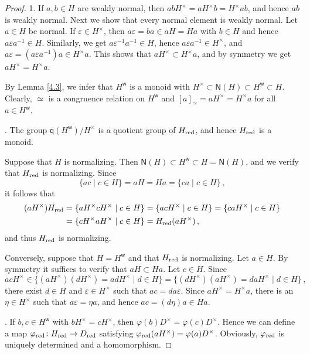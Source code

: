 \documentclass[a4paper]{amsart}
\theoremstyle{definition}
\numberwithin{equation}{section}
\begin{document}
\begin{proof}
1. If $a, b \in H$ are weakly normal, then $abH^{\times} =
aH^{\times}b = H^{\times} ab$, and hence $ab$ is weakly normal. Next
we show that every normal element is weakly normal. Let $a \in H$ be
normal. If $\varepsilon \in H^{\times}$, then $a \varepsilon = ba
\in aH = Ha$ with $b \in H$ and hence $a \varepsilon a^{-1} \in H$.
Similarly, we get $a \varepsilon^{-1}a^{-1} \in H$, hence $a
\varepsilon a^{-1} \in H^{\times}$, and $a \varepsilon = (a
\varepsilon a^{-1})a \in H^{\times} a$. This shows that $aH^{\times}
\subset H^{\times}a$, and by symmetry we get $aH^{\times} =
H^{\times} a$.

By Lemma \ref{4.3}, we infer that $H^{\mathsf w}$ is a monoid with
$H^{\times} \subset \mathsf N (H) \subset H^{\mathsf w} \subset H$.
Clearly, $\simeq$ is a congruence relation on $H^{\mathsf w}$ and
$[a]_{\simeq} = aH^{\times} = H^{\times}a$ for all $a \in H^{\mathsf
w}$.

. The group $\mathsf q (H^{\mathsf w})/H^{\times}$ is a quotient
group of $H_{{\text{\rm red}}}$, and hence $H_{{\text{\rm red}}}$ is a monoid.

Suppose that $H$ is normalizing. Then $\mathsf N (H) \subset
H^{\mathsf w} \subset H = \mathsf N (H)$, and we verify that
$H_{{\text{\rm red}}}$ is normalizing. Since
\[
\{ a c \mid c \in H \} = aH = Ha = \{ ca \mid c \in H \} \,,
\]
it follows that
\[
\begin{aligned}
(aH^{\times}) H_{{\text{\rm red}}} & = \{ aH^{\times} c H^{\times} \mid c \in H
\} = \{ ac H^{\times} \mid c \in H \} = \{ ca H^{\times} \mid c \in
H \} \\ & = \{ cH^{\times} a H^{\times} \mid c \in H \} =
H_{{\text{\rm red}}}(aH^{\times}) \,,
\end{aligned}
\]
and thus $H_{{\text{\rm red}}}$ is normalizing.

\smallskip
Conversely, suppose that $H = H^{\mathsf w}$ and that $H_{{\text{\rm red}}}$ is
normalizing. Let $a \in H$. By symmetry it suffices to verify that
$a H \subset Ha$. Let $c \in H$. Since
\[
acH^{\times} \in \{ (aH^{\times})(d H^{\times}) = a d H^{\times}
\mid d \in H \} = \{ (dH^{\times})(aH^{\times}) = daH^{\times} \mid
d \in H \} \,,
\]
there exist $d \in H$  and $\varepsilon \in H^{\times}$ such that
$ac = da \varepsilon$. Since $aH^{\times} = H^{\times}a$, there is
an $\eta \in H^{\times}$ such that $a \varepsilon = \eta a$, and
hence $ac = (d\eta)a \in Ha$.

. If $b, c \in H^{\mathsf w}$ with $bH^{\times} = c H^{\times}$, then $\varphi (b)D^{\times} = \varphi (c) D^{\times}$. Hence we can define a map $\varphi_{{\text{\rm red}}} \colon H_{{\text{\rm red}}} \to D_{{\text{\rm red}}}$ satisfying $\varphi_{{\text{\rm red}}} (aH^{\times}) = \varphi (a) D^{\times}$. Obviously, $\varphi_{{\text{\rm red}}}$ is uniquely determined and a homomorphism.


\end{proof}
\end{document}
